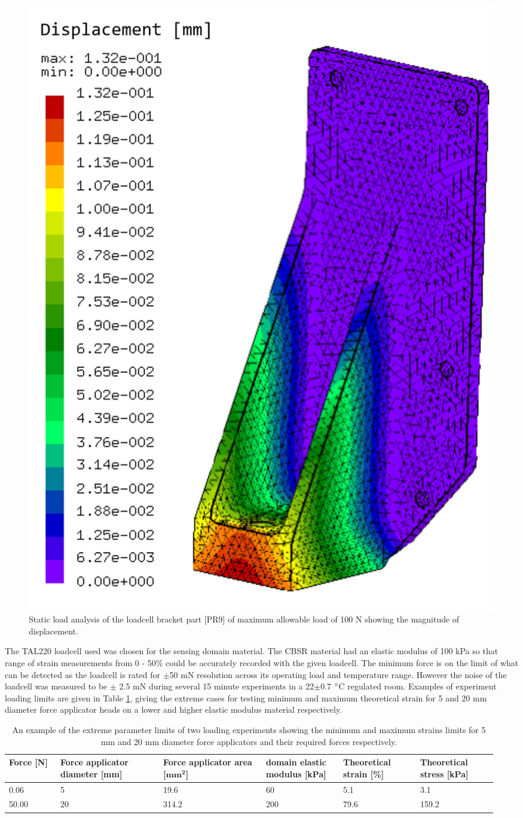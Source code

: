 \begin{figure}[H]
\centering
\includegraphics[width=0.45\linewidth]{Figures/fea_ccx_loadcell_bracket.png}
\caption{Static load analysis of the loadcell bracket part [PR9] of maximum allowable load of 100 N showing the magnitude of displacement. }
\label{fig:FEA_force_aplc}
\end{figure}

The TAL220 loadcell used was chosen for the sensing domain material. The CBSR material had an elastic modulus of 100 kPa \cite{Ellingham2024} so that range of strain measurements from 0 - 50\% could be accurately recorded with the given loadcell. The minimum force is on the limit of what can be detected as the loadcell is rated for $\pm$50 mN resolution \cite{HTCSensor2024} across its operating load and temperature range. However the noise of the loadcell was measured to be $\pm$ 2.5 mN during several 15 minute experiments in a 22$\pm$0.7 $\degree$C regulated room. Examples of experiment loading limits are given in Table \ref{tab:cfa_limits}, giving the extreme cases for testing minimum and maximum theoretical strain for 5 and 20 mm diameter force applicator heads on a lower and higher elastic modulus material respectively.
\begin{table}[H]
\hspace{-1cm}
\caption{An example of the extreme parameter limits of two loading experiments showing the minimum and maximum strains limits for 5 mm and 20 mm diameter force applicators and their required forces respectively.}
\label{tab:cfa_limits}

\hspace{-1cm}
\begin{tabular}{|p{0.1\linewidth}|p{0.2\linewidth}|p{0.2\linewidth}|p{0.15\linewidth}|p{0.15\linewidth}|p{0.15\linewidth}|} \hline
	\textbf{Force [N]} &
	\textbf{Force applicator diameter [mm]} &
	\textbf{Force applicator area [$\mathbf{mm^2}$]} &
	\textbf{domain elastic modulus [kPa]} &
	\textbf{Theoretical strain [\%]} &
	\textbf{Theoretical stress [kPa]} \\ \hline
	0.06 &
	5 &
	19.6 &
	60 &
	5.1 &
	3.1 \\ \hline
	50.00 &
	20 &
	314.2 &
	200 &
	79.6 &
	159.2 \\ \hline
\end{tabular}
\end{table}

